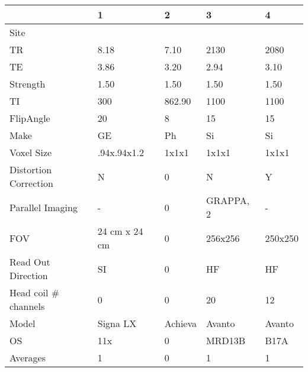 \begin{table}
[]
\centering
\begin{tabular}{lllll}
\toprule
{} & 1 & 2 & 3 & 4 \\
\midrule
Site                  &                    &                    &                      &                      \\
TR                    &               8.18 &               7.10 &                 2130 &                 2080 \\
TE                    &               3.86 &               3.20 &                 2.94 &                 3.10 \\
Strength              &               1.50 &               1.50 &                 1.50 &                 1.50 \\
TI                    &                300 &             862.90 &                 1100 &                 1100 \\
FlipAngle             &                 20 &                  8 &                   15 &                   15 \\
Make                  &                 GE &                 Ph &                   Si &                   Si \\
Voxel Size            &        .94x.94x1.2 &              1x1x1 &                1x1x1 &                1x1x1 \\
Distortion Correction &                  N &                  0 &                    N &                    Y \\
Parallel Imaging      &                  - &                  0 &            GRAPPA, 2 &                    - \\
FOV                   &      24 cm x 24 cm &                  0 &              256x256 &              250x250 \\
Read Out Direction    &                 SI &                  0 &                   HF &                   HF \\
Head coil \# channels  &                  0 &                  0 &                   20 &                   12 \\
Model                 &           Signa LX &            Achieva &               Avanto &               Avanto \\
OS                    &                11x &                  0 &               MRD13B &                 B17A \\
Averages              &                  1 &                  0 &                    1 &                    1 \\

\end{tabular}
\end{table}
